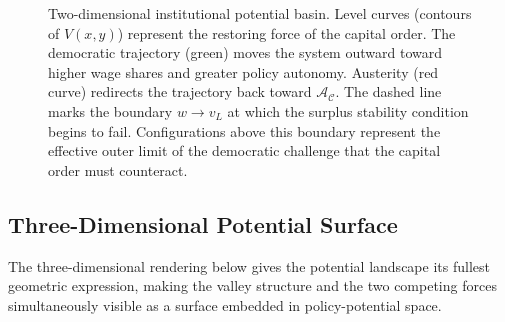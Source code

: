 \documentclass[12pt,a4paper]{article}
\theoremstyle{definition}
\theoremstyle{remark}
\begin{document}
\begin{figure}[ht]
\caption{Two-dimensional institutional potential basin. Level curves (contours of $V(x,y)$) represent the restoring force of the capital order. The democratic trajectory (green) moves the system outward toward higher wage shares and greater policy autonomy. Austerity (red curve) redirects the trajectory back toward $\mathcal{A}_\mathcal{C}$. The dashed line marks the boundary $w \to v_L$ at which the surplus stability condition begins to fail. Configurations above this boundary represent the effective outer limit of the democratic challenge that the capital order must counteract.}
\label{fig:basin_2d}
\end{figure}

\subsection{Three-Dimensional Potential Surface}

The three-dimensional rendering below gives the potential landscape its fullest geometric expression, making the valley structure and the two competing forces simultaneously visible as a surface embedded in policy-potential space.
\end{document}
